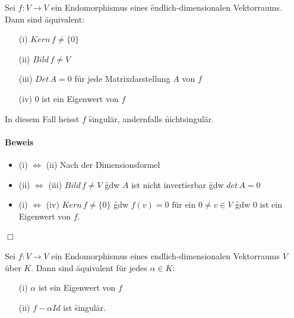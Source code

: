 \begin{lemma} %
Sei $f: V \rightarrow V$ ein Endomorphismus eines \f{endlich}-dimensionalen Vektorraums. Dann sind äquivalent:
\begin{itemize}
 \item[(i)] $Kern\, f \neq \{0\}$
 \item[(ii)] $Bild\, f\neq V$
 \item[(iii)] $Det\, A = 0$ für jede Matrixdarstellung $A$ von $f$
 \item[(iv)] 0 ist ein Eigenwert von $f$
\end{itemize}
In diesem Fall heisst $f$ \f{singulär}, andernfalls \f{nichtsingulär}.
\end{lemma}

\paragraph{Beweis}
\begin{itemize}
 \item (i) $\Leftrightarrow$ (ii) Nach der Dimensionsformel
 \item (ii) $\Leftrightarrow$ (iii) $Bild\, f \neq V$ \f{gdw} $A$ ist nicht invertierbar \f{gdw} $det\, A = 0$
 \item (i) $\Leftrightarrow$ (iv) $Kern\, f \neq \{0\}$ \f{gdw} $f(v) = 0$ für ein $0 \neq v \in V$ \f{gdw} 0 ist ein Eigenwert von $f$. 
\end{itemize}
\hfill $\Box$

\begin{korollar} %
Sei $f: V \rightarrow V$ ein Endomorphismus eines endlich-dimensionalen Vektorraums $V$ über $K$. Dann sind äquivalent für jedes $\alpha \in K$:
\begin{itemize}
 \item[(i)] $\alpha$ ist ein Eigenwert von $f$
 \item[(ii)] $f-\alpha Id$ ist \f{singulär}.
\end{itemize}
\end{korollar}

